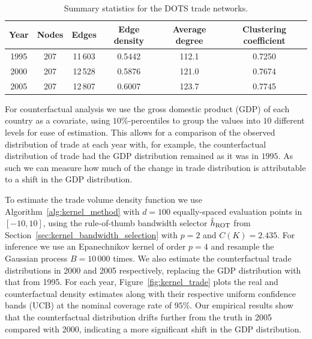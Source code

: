 \begin{table}[b!]
  \centering
  \begin{tabular}{|c|c|c|c|c|c|}
    \hline
    Year & Nodes & Edges & Edge density & Average degree
    & Clustering coefficient \\
    \hline
    1995 & 207 & 11\,603 & 0.5442 & 112.1 & 0.7250 \\
    2000 & 207 & 12\,528 & 0.5876 & 121.0 & 0.7674 \\
    2005 & 207 & 12\,807 & 0.6007 & 123.7 & 0.7745 \\
    \hline
  \end{tabular}
  \caption[Summary statistics for the DOTS trade networks]{
  Summary statistics for the DOTS trade networks.}
  \label{tab:kernel_trade_network_stats}
\end{table}

For counterfactual analysis we use the gross domestic product (GDP) of each
country as a covariate, using $10\%$-percentiles to group the values into $10$
different levels for ease of estimation. This allows for a comparison of the
observed distribution of trade at each year with, for example, the
counterfactual distribution of trade had the GDP distribution remained as it
was in $1995$. As such we can measure how much of the change in trade
distribution is attributable to a shift in the GDP distribution.

To estimate the trade volume density function we use
Algorithm~\ref{alg:kernel_method}
with $d=100$ equally-spaced evaluation points in $[-10,10]$, using the
rule-of-thumb bandwidth selector $\hat h_{\operatorname{ROT}}$ from
Section~\ref{sec:kernel_bandwidth_selection} with $p=2$ and $C(K) = 2.435$. For
inference we use an Epanechnikov kernel of order $p=4$ and resample the
Gaussian process $B = 10\,000$ times. We also estimate the counterfactual trade
distributions in 2000 and 2005 respectively, replacing the GDP distribution
with that from 1995. For each year, Figure~\ref{fig:kernel_trade} plots the
real and
counterfactual density estimates along with their respective uniform confidence
bands (UCB) at the nominal coverage rate of $95\%$. Our empirical results show
that the counterfactual distribution drifts further from the truth in 2005
compared with 2000, indicating a more significant shift in the GDP
distribution.

